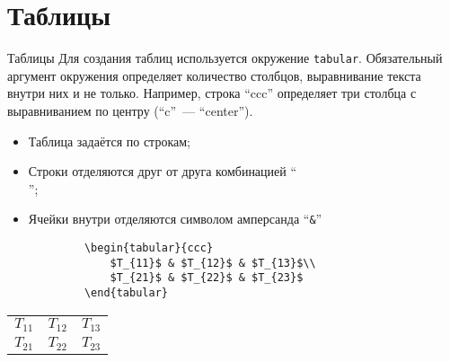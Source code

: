\section{Таблицы}

\begin{frame}[fragile]{Таблицы}
	\small
	Для создания таблиц используется окружение \texttt{tabular}. Обязательный аргумент окружения определяет количество столбцов, выравнивание текста внутри них и не только. Например, строка ``ccc'' определяет три столбца с выравниванием по центру (``c''~--- ``center'').  
	\begin{itemize}
		\item Таблица задаётся по строкам;
		\item Строки отделяются друг от друга комбинацией ``\texttt{\\}'';
		\item Ячейки внутри отделяются символом амперсанда ``\texttt{&}''
	\end{itemize}
		
	\begin{minipage}{0.49\textwidth}
		\begin{verbatim}
			\begin{tabular}{ccc}
				$T_{11}$ & $T_{12}$ & $T_{13}$\\
				$T_{21}$ & $T_{22}$ & $T_{23}$ 
			\end{tabular}
		\end{verbatim}
	\end{minipage}
	\begin{minipage}{0.49\textwidth}
		\begin{center}
			\begin{tabular}{ccc}
				$T_{11}$ & $T_{12}$ & $T_{13}$\\
				$T_{21}$ & $T_{22}$ & $T_{23}$ 
			\end{tabular}
		\end{center}
	\end{minipage}

\end{frame}

